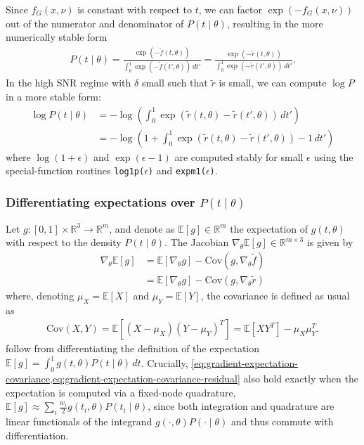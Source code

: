 \documentclass{article}
\begin{document}
Since $f_G(x,\nu)$ is constant with respect to $t$, we can factor $\exp(-f_G(x,\nu))$ out of the numerator and denominator of $P(t \mid \theta)$, resulting in the more numerically stable form
%
\begin{align}
  P(t \mid \theta)
  = \frac{\exp(-\tilde{f}(t, \theta))}{\int_0^1 \exp(-\tilde{f}(t', \theta)) \, dt'}
  = \frac{\exp(-\tilde{r}(t, \theta))}{\int_0^1 \exp(-\tilde{r}(t', \theta)) \, dt'}.
\end{align}
%
In the high SNR regime with $\delta$ small such that $\tilde{r}$ is small, we can compute $\log P$ in a more stable form:
%
\begin{align}
  \log P(t \mid \theta)
   & = -\log \left( \int_0^1 \exp(\tilde{r}(t, \theta) - \tilde{r}(t', \theta)) \, dt' \right)        \\
   & = -\log \left(1 + \int_0^1 \exp(\tilde{r}(t, \theta) - \tilde{r}(t', \theta)) - 1 \, dt' \right)
\end{align}
%
where $\log(1 + \epsilon)$ and $\exp(\epsilon - 1)$ are computed stably for small $\epsilon$ using the special-function routines \texttt{log1p($\epsilon$)} and \texttt{expm1($\epsilon$)}.

\subsubsection{Differentiating expectations over $P(t \mid \theta)$}\label{sec:jacobian-expectation-covariance}

Let $g : [0, 1] \times \mathbb{R}^3 \to \mathbb{R}^m$, and denote as $\mathbb{E}[g] \in \mathbb{R}^m$ the expectation of $g(t, \theta)$ with respect to the density $P(t \mid \theta)$.
The Jacobian $\nabla_\theta \mathbb{E}[g] \in \mathbb{R}^{m \times 3}$ is given by
%
\begin{align}
  \nabla_\theta \mathbb{E}[g] & = \mathbb{E}[\nabla_\theta g] - \mathrm{Cov}(g, \nabla_\theta \tilde{f}) \label{eq:gradient-expectation-covariance}          \\
                              & = \mathbb{E}[\nabla_\theta g] - \mathrm{Cov}(g, \nabla_\theta \tilde{r}) \label{eq:gradient-expectation-covariance-residual}
\end{align}
%
where, denoting $\mu_X = \mathbb{E}[X]$ and $\mu_Y = \mathbb{E}[Y]$, the covariance is defined as usual as
%
\begin{align}
  \mathrm{Cov}(X, Y) = \mathbb{E}[(X - \mu_X)(Y - \mu_Y)^T] = \mathbb{E}[X Y^T] - \mu_X \mu_Y^T.
\end{align}
%
 follow from differentiating the definition of the expectation $\mathbb{E}[g] = \int_0^1 g(t, \theta) P(t \mid \theta) \, dt$.
Crucially, \cref{eq:gradient-expectation-covariance,eq:gradient-expectation-covariance-residual} also hold exactly when the expectation is computed via a fixed-node quadrature, $\mathbb{E}[g] \approx \sum_i \frac{w_i}{2} g(t_i, \theta) P(t_i \mid \theta)$, since both integration and quadrature are linear functionals of the integrand $g(\cdot,\theta) P(\cdot \mid \theta)$ and thus commute with differentiation.
\end{document}
